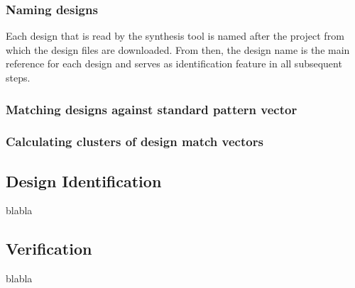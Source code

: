 \subsubsection{Naming designs} 
Each design that is read by the synthesis tool is named after the project from
which the design files are downloaded. From then, the design name is the main
reference for each design and serves as identification feature in all
subsequent steps.

\subsubsection{Matching designs against standard pattern vector}
\subsubsection{Calculating clusters of design match vectors}

\subsection{Design Identification}
blabla

\subsection{Verification}
blabla




